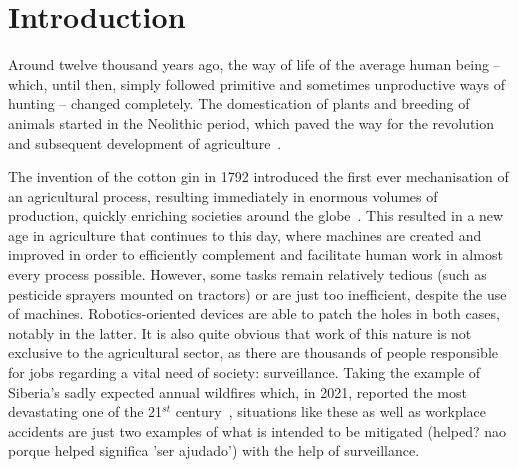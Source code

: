 




\chapter{Introduction}\label{cha:I_introduction}

Around twelve thousand years ago, the way of life of the average human being -- which, until then, simply followed primitive and sometimes unproductive ways of hunting -- changed completely. The domestication of plants and breeding of animals started in the Neolithic period, which paved the way for the revolution and subsequent development of agriculture~\cite{Zeder2011TheOO}.

The invention of the cotton gin in 1792 introduced the first ever mechanisation of an agricultural process, resulting immediately in enormous volumes of production, quickly enriching societies around the globe~\cite{Roe1926}.
This resulted in a new age in agriculture that continues to this day, where machines are created and improved in order to efficiently complement and facilitate human work in almost every process possible.
However, some tasks remain relatively tedious (such as pesticide sprayers mounted on tractors) or are just too inefficient, despite the use of machines. Robotics-oriented devices are able to patch the holes in both cases, notably in the latter.
It is also quite obvious that work of this nature is not exclusive to the agricultural sector, as there are thousands of people responsible for jobs regarding a vital need of society: surveillance.
Taking the example of Siberia's sadly expected annual wildfires which, in 2021, reported the most devastating one of the 21$^{st}$ century~\cite{dixon_2021,roth_2021}, situations like these as well as workplace accidents are just two examples of what is intended to be mitigated (helped? nao porque helped significa 'ser ajudado') with the help of surveillance.


